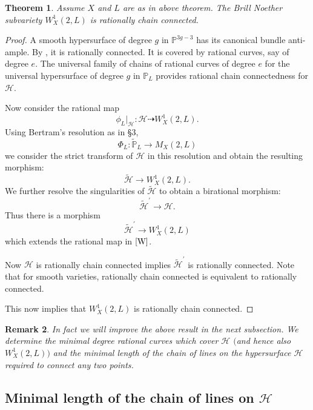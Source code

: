 \documentclass[12pt, reqno]{amsart}
\newtheorem{theorem}{Theorem}[section]
\newtheorem{remark}[theorem]{Remark}
\begin{document}
\begin{theorem} Assume $X$ and $L$ are as in above theorem.
The Brill Noether subvariety $W^1_X(2, L)$ is rationally chain connected.
\end{theorem}
\begin{proof}
 A smooth hypersurface of degree $g$ in $\mathbb{P}^{3g-3}$ has its canonical bundle anti-ample. By \cite{MM}, it is rationally connected. It is covered by rational curves, say of degree $e$. The universal family of chains of rational curves of degree $e$ for the universal hypersurface of degree $g$ in $\mathbb{P}_L$ provides rational chain connectedness for $\mathcal{H}$.

Now consider the rational map
\begin{equation}\label{W}
\phi_L|_{\mathcal{H}}:\mathcal{H} \dashrightarrow W^1_X(2,L).
\end{equation}
Using Bertram's resolution as in \S 3,
$$
\Phi_L: \widetilde{\mathbb{P}}_L \rightarrow M_X(2,L)
$$
we consider the strict transform of $\mathcal{H}$ in this resolution and obtain the resulting morphism:
$$
\widetilde{\mathcal{H}} \rightarrow W^1_X(2,L).
$$
We further resolve the singularities of $\widetilde{\mathcal{H}}$ to obtain a birational morphism:
$$
{\widetilde{\mathcal{H}}}^{'} \rightarrow \mathcal{H}.
$$
Thus there is a morphism
$$
{\widetilde{\mathcal{H}}}^{'} \rightarrow W^1_X(2,L)
$$
which extends the rational map in $\eqref{W}$.

Now  $\mathcal{H}$ is rationally chain connected implies ${\widetilde{\mathcal{H}}}^{'}$ is rationally connected.
Note that for smooth varieties, rationally chain connected is equivalent to rationally connected.

This now implies that $W^1_X(2,L)$ is rationally chain connected.
\end{proof}

\begin{remark}
In fact we will improve the above result in the next subsection. We determine the minimal degree rational curves which cover $\mathcal{H}$ $($and hence also $W^{1}_{X}(2,L)$$)$  and the minimal length of the chain of lines on the hypersurface 
$\mathcal{H}$ required to connect any two points.
\end{remark}

\subsection{Minimal length of the chain of lines on $\mathcal{H}$}
\end{document}
